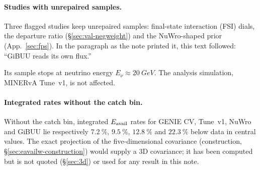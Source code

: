 \paragraph{Studies with unrepaired samples.} Three flagged studies keep unrepaired samples: final-state interaction (FSI) dials, the departure ratio (\S\ref{sec:val-negweight}) and the NuWro-shaped prior (App.~\ref{sec:fps}). In the paragraph as the note printed it, this text followed: ``GiBUU reads its own flux.''\par Its sample stops at neutrino energy $E_\nu\approx\SI{20}{GeV}$. The analysis simulation, MINERvA Tune~v1, is not affected.

\paragraph{Integrated rates without the catch bin.} Without the catch bin, integrated $E_{\mathrm{avail}}$ rates for GENIE CV, Tune~v1, NuWro and GiBUU lie respectively $\SI{7.2}{\percent}$, $\SI{9.5}{\percent}$, $\SI{12.8}{\percent}$ and $\SI{22.3}{\percent}$ below data in central values. The exact projection of the five-dimensional covariance (construction, \S\ref{sec:eavailw-construction}) would supply a 3D covariance; it has been computed but is not quoted (\S\ref{sec:3d}) or used for any result in this note.

